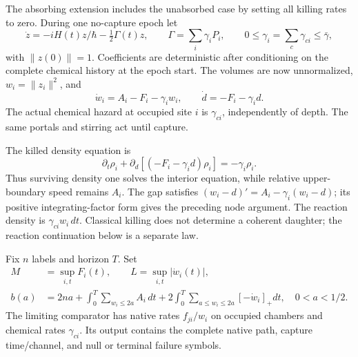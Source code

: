 \documentclass[11pt,oneside,openany]{book}
\theoremstyle{definition}
\theoremstyle{remark}\newtheorem{remark}[theorem]{Remark}
\begin{document}
The absorbing extension includes the unabsorbed case by setting all killing rates to zero. During one no-capture epoch let
\begin{equation}
 \dot z=-iH(t)z/\hbar-\tfrac12\Gamma(t)z,
 \qquad\Gamma=\sum_i\gamma_iP_i,
 \qquad0\le\gamma_i=\sum_c\gamma_{ci}\le\bar\gamma,
 \label{chamber:killedwave}
\end{equation}
with $\|z(0)\|=1$. Coefficients are deterministic after conditioning on the complete chemical history at the epoch start. The volumes are now unnormalized, $w_i=\|z_i\|^2$, and
\begin{equation}
 \dot w_i=A_i-F_i-\gamma_iw_i,
 \qquad\dot d=-F_i-\gamma_i d.
 \label{chamber:killeddrift}
\end{equation}
The actual chemical hazard at occupied site $i$ is $\gamma_{ci}$, independently of depth. The same portals and stirring act until capture.

The killed density equation is
\[
 \partial_t\rho_i+\partial_d[(-F_i-\gamma_i d)\rho_i]=-\gamma_i\rho_i.
\]
Thus surviving density one solves the interior equation, while relative upper-boundary speed remains $A_i$. The gap satisfies
$(w_i-d)'=A_i-\gamma_i(w_i-d)$; its positive integrating-factor form gives the preceding node argument. The reaction density is $\gamma_{ci}w_i\,dt$. Classical killing does not determine a coherent daughter; the reaction continuation below is a separate law.

Fix $n$ labels and horizon $T$. Set
\begin{align}
 M&=\sup_{i,t}F_i(t),\qquad L=\sup_{i,t}|\dot w_i(t)|,\\
 b(a)&=2na+\int_0^T\sum_{w_i\le2a}A_i\,dt
        +2\int_0^T\sum_{a\le w_i\le2a}[-\dot w_i]_+dt,
 \quad0<a<1/2.
 \label{chamber:nodebudget}
\end{align}
The limiting comparator has native rates $f_{ji}/w_i$ on occupied chambers and chemical rates $\gamma_{ci}$. Its output contains the complete native path, capture time/channel, and null or terminal failure symbols.
\end{document}
